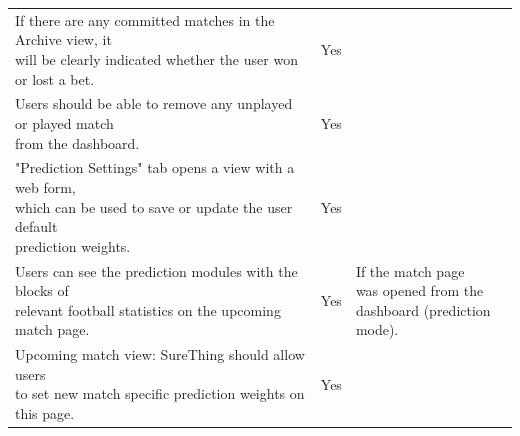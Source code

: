 \begin{tabular}{@{}lll@{}}
	\specialcell[t]{If there are any committed matches in the Archive view,  it\\ will be clearly indicated whether the user won or lost a bet.} &  Yes &  \\	 
	\specialcell[t]{Users should be able to remove any unplayed or played match \\ from the dashboard.} &  Yes &  \\ 
	\specialcell[t]{"Prediction Settings" tab opens a view with a web form,\\ which can be used to save or update the user default \\ prediction weights.} &  Yes &  \\ 
	 \specialcell[t]{Users can see the prediction modules with the blocks of\\ relevant football statistics on the upcoming match page.} &  Yes &  \specialcell[t]{If the match page \\ was opened from the\\ dashboard (prediction mode).} \\ 
	\specialcell[t]{Upcoming match view: SureThing should allow users \\ to set new match specific prediction weights on this page.} &  Yes &  \\ 	
	\hline
\end{tabular}

